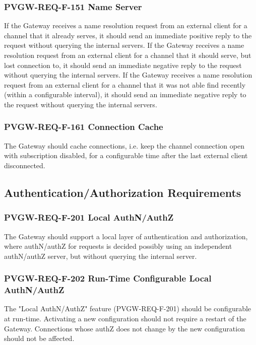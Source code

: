 \documentclass[11pt
  , a4paper
  , article
  , oneside
]{memoir}
\begin{document}
\subsubsection{PVGW-REQ-F-151 Name Server}
If the Gateway receives a name resolution request from an external client for a channel that it already serves, it should send an immediate positive reply to the request without querying the internal servers. If the Gateway receives a name resolution request from an external client for a channel that it should serve, but lost connection to, it should send an immediate negative reply to the request without querying the internal servers. If the Gateway receives a name resolution request from an external client for a channel that it was not able find recently (within a configurable interval), it should send an immediate negative reply to the request without querying the internal servers.

\subsubsection{PVGW-REQ-F-161 Connection Cache}
The Gateway should cache connections, i.e. keep the channel connection open with subscription disabled, for a configurable time after the last external client disconnected.


\subsection{Authentication/Authorization Requirements}

\subsubsection{PVGW-REQ-F-201 Local AuthN/AuthZ}
The Gateway should support a local layer of authentication and authorization, where authN/authZ for requests is decided possibly using an independent authN/authZ server, but without querying the internal server.

\subsubsection{PVGW-REQ-F-202 Run-Time Configurable Local AuthN/AuthZ}
The "Local AuthN/AuthZ" feature (PVGW-REQ-F-201) should be configurable at run-time. Activating a new configuration should not require a restart of the Gateway. Connections whose authZ does not change by the new configuration should not be affected.
\end{document}
